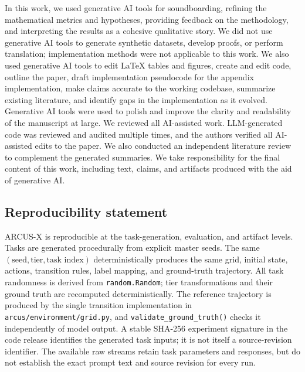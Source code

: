 \documentclass{article}
\begin{document}
In this work, we used generative AI tools for soundboarding, refining the mathematical metrics and hypotheses, providing feedback on the methodology, and interpreting the results as a cohesive qualitative story. We did not use generative AI tools to generate synthetic datasets, develop proofs, or perform translation; implementation methods were not applicable to this work. We also used generative AI tools to edit LaTeX tables and figures, create and edit code, outline the paper, draft implementation pseudocode for the appendix implementation, make claims accurate to the working codebase, summarize existing literature, and identify gaps in the implementation as it evolved. Generative AI tools were used to polish and improve the clarity and readability of the manuscript at large. We reviewed all AI-assisted work. LLM-generated code was reviewed and audited multiple times, and the authors verified all AI-assisted edits to the paper. We also conducted an independent literature review to complement the generated summaries. We take responsibility for the final content of this work, including text, claims, and artifacts produced with the aid of generative AI.

\subsection*{Reproducibility statement}
ARCUS-X is reproducible at the task-generation, evaluation, and artifact levels.
Tasks are generated procedurally from explicit master seeds. The same
$(\text{seed},\text{tier},\text{task index})$ deterministically produces the
same grid, initial state, actions, transition rules, label mapping, and
ground-truth trajectory. All task randomness is derived from
\texttt{random.Random}; tier transformations and their ground truth are
recomputed deterministically. The reference trajectory is produced by the
single transition implementation in \texttt{arcus/environment/grid.py}, and
\texttt{validate\_ground\_truth()} checks it independently of model output.
A stable SHA-256 experiment signature in the code release identifies
the generated task inputs; it is not itself a source-revision identifier. The available raw streams retain task parameters and responses, but do
not establish the exact prompt text and source revision for every run.
\end{document}
